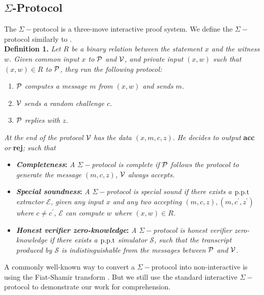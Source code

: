 \subsection{$\Sigma$-Protocol}
\label{sec:sigma}
The $\Sigma-$protocol is a three-move interactive proof system. We define the $\Sigma-$protocol similarly to \cite{damgard10}. \\
\textbf{Definition 1.} \textit{Let $R$ be a binary relation between the statement $x$ and the witness $w$. Given common input $x$ to }$\mathcal{P}$\textit{ and }$\mathcal{V}$\textit{, and private input $(x,w)$ such that $(x,w)\in{R}$ to }$\mathcal{P}$\textit{, they run the following protocol:}
\begin{enumerate}
    \item $\mathcal{P}$ \textit{computes a message $m$ from $(x,w)$ and sends $m$.}
    \item $\mathcal{V}$ \textit{sends a random challenge $c$.}
    \item $\mathcal{P}$ \textit{replies with $z$.}
\end{enumerate}
\textit{At the end of the protocol }$\mathcal{V}$ \textit{has the data $(x,m,c,z)$}. \textit{He decides to output }\textbf{acc}\textit{ or }\textbf{rej}\textit{; such that}
\begin{itemize}
    \item \textbf{\textit{Completeness}:} \textit{A $\Sigma-$protocol is complete if} $\mathcal{P}$ \textit{follows the protocol to generate the message $(m,c,z)$,} $\mathcal{V}$ \textit{always accepts.}
    \item \textbf{\textit{Special soundness}:} \textit{A $\Sigma-$protocol is special sound if there exists a $\text{p.p.t}$ extractor $\mathcal{E}$, given any input $x$ and any two accepting $(m,c,z),(m,c^\prime,z^\prime)$ where $c\ne{c^\prime}$, $\mathcal{E}$ can compute $w$ where $(x,w)\in{R}$.}
    \item \textbf{\textit{Honest verifier zero-knowledge}:} \textit{A $\Sigma-$protocol is honest verifier zero-knowledge if there exists a $\text{p.p.t}$ simulator $\mathcal{S}$, such that the transcript produced by $\mathcal{S}$ is indistinguishable from the messages between }$\mathcal{P}$\textit{ and }$\mathcal{V}$\textit{.}
\end{itemize}
A commonly well-known way to convert a $\Sigma-$protocol into non-interactive is using the Fiat-Shamir transform \cite{fs}. But we still use the standard interactive $\Sigma-$protocol to demonstrate our work for comprehension.

